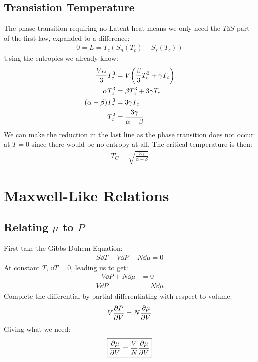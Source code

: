 \documentclass[12pt]{article}
\begin{document}
\subsection{Transistion Temperature}
The phase transition requiring no Latent heat means we only need the $T\dd{S}$ part of the first law, expanded to a difference:
\begin{align*}
  0=L=T_c(S_n(T_c)-S_s(T_c))
\end{align*}
Using the entropies we already know:
\begin{align*}
  \frac{V\alpha}{3}T_c^3&=V\qty(\frac\beta3T_c^3+\gamma T_c)\\
  \alpha T_c^3&=\beta T_c^3+3\gamma T_c\\
  \qty(\alpha-\beta)T_c^3&=3\gamma T_c\\
  T_c^2&=\frac{3\gamma}{\alpha-\beta}
\end{align*}
We can make the reduction in the last line as the phase transition does not occur at $T=0$ since there would be no entropy at all. The critical temperature is then:
\begin{align}
  \boxed{T_C=\sqrt{\frac{3\gamma}{\alpha-\beta}}}
\end{align}
\newpage
\section{Maxwell-Like Relations}
\subsection{Relating $\mu$ to $P$}
First take the Gibbs-Duhem Equation:
\begin{align*}
  S\dd{T}-V\dd{P}+N\dd{\mu}=0
\end{align*}
At constant $T$, $\dd{T}=0$, leading us to get:
\begin{align*}
  -V\dd{P}+N\dd{\mu}&=0\\
  V\dd{P}&=N\dd{\mu}
\end{align*}
Complete the differential by partial differentiating with respect to volume:
\begin{align*}
  V\pdv{P}{V}=N\pdv{\mu}{V}
\end{align*}
Giving what we need:
\begin{align}
  \boxed{\pdv{\mu}{V}=\frac{V}{N}\pdv{\mu}{V}}
\end{align}
\end{document}
